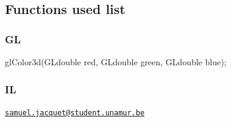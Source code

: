 \documentclass[12pt]{article}
\begin{document}
\subsection{Functions used list}
\subsubsection{GL}
\begin{tabbing}
glColor3d(GLdouble red, GLdouble green, GLdouble blue);
\end{tabbing}

\subsubsection{IL}
\begin{tabbing}

\end{tabbing}
\newpage



\newpage
\href{mailto:samuel.jacquet@student.unamur.be}{\nolinkurl{samuel.jacquet@student.unamur.be} }
\end{document}
